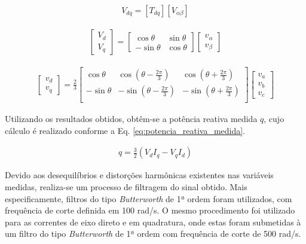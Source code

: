 \begin{align}
V_{dq} = [T_{dq}][V_{\alpha \beta}]\nonumber
\end{align}

\begin{align}\label{eq:matrix_transformacao}
\begin{bmatrix}
	V_d \\ V_q
\end{bmatrix} = 
\begin{bmatrix}
	\cos{\theta} & \sin{\theta} \\
	-\sin{\theta} & \cos{\theta}
\end{bmatrix}
\begin{bmatrix}
	v_{\alpha} \\ v_{\beta}
\end{bmatrix}
\end{align}

\begin{align}\label{eq:matriz_transformacao_2}
	\begin{bmatrix}
		v_d \\ v_q
	\end{bmatrix} = \frac{2}{3}
	\begin{bmatrix}
		\cos{\theta} & \cos(\theta - \frac{2\pi}{3}) & \cos(\theta + \frac{2\pi}{3}) \\
		-\sin{\theta} & -\sin(\theta - \frac{2\pi}{3}) & -\sin(\theta + \frac{2\pi}{3}) \\
	\end{bmatrix}
	\begin{bmatrix}
		v_a \\ v_b \\ v_c
	\end{bmatrix}
\end{align}

Utilizando os resultados obtidos, obtêm-se a potência reativa medida $q$, cujo cálculo é realizado conforme a Eq. \ref{eq:potencia_reativa_medida}.

\begin{align}\label{eq:potencia_reativa_medida}
	q = \frac{3}{2}(V_d I_q - V_q I_d)
\end{align}

Devido aos desequilíbrios e distorções harmônicas existentes nas variáveis medidas, realiza-se um processo de filtragem do sinal obtido. Mais especificamente, filtros do tipo \textit{Butterworth} de 1ª ordem foram utilizados, com frequência de corte definida em 100 rad/s. O mesmo procedimento foi utilizado para as correntes de eixo direto e em quadratura, onde estas foram submetidas à um filtro do tipo \textit{Butterworth} de 1ª ordem com frequência de corte de 500 rad/s.

